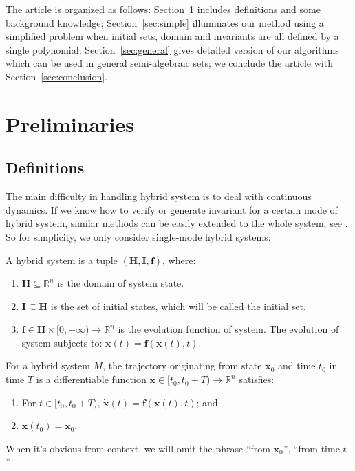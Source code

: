 \documentclass{jssc}
\begin{document}
The article is organized as follows: Section~\ref{sec:preliminaries} includes definitions and some background knowledge; Section~\ref{sec:simple} illuminates our method using a simplified problem when initial sets, domain and invariants are all defined by a single polynomial; Section~\ref{sec:general} gives detailed version of our algorithms which can be used in general semi-algebraic sets; we conclude the article with Section~\ref{sec:conclusion}.

\section{Preliminaries}
\label{sec:preliminaries}
\subsection{Definitions}
The main difficulty in handling hybrid system is to deal with continuous dynamics. If we know how to verify or generate invariant for a certain mode of hybrid system, similar methods can be easily extended to the whole system, see \cite{prajna2004safety, kong2016invariant}. So for simplicity, we only consider single-mode hybrid systems:

\begin{definition}
A hybrid system is a tuple $(\boldsymbol{H}, \boldsymbol{I}, \boldsymbol{f})$,  where:
	\begin{enumerate}
		\item $\boldsymbol{H} \subseteq \mathbb{R}^n$  is the domain of system state.
		\item $\boldsymbol{I} \subseteq \boldsymbol{H}$ is the set of initial states, which will be called the initial set.
		\item $\boldsymbol{f} \in \boldsymbol{H} \times [0, +\infty) \rightarrow \mathbb{R}^n$ is the evolution function of system. The evolution of system subjects to: $\dot{\boldsymbol{x}}(t) = \boldsymbol{f}(\boldsymbol{x}(t),t)$.
	\end{enumerate}
\end{definition}

\begin{definition}[Trajectory]
For a hybrid system $M$, the trajectory originating from state $\boldsymbol{x}_0$ and time $t_0$ in time $T$ is a differentiable function $\boldsymbol{x} \in [t_0, t_0 + T) \rightarrow \mathbb{R}^n$ satisfies:
	\begin{enumerate}
		\item For $t \in [t_0, t_0 + T)$, $\dot{\boldsymbol{x}}(t) = \boldsymbol{f}(\boldsymbol{x}(t),t)$; and
		\item $\boldsymbol{x}(t_0) = \boldsymbol{x}_0$.
	\end{enumerate}
	
When it's obvious from context, we will omit the phrase ``from $\boldsymbol{x}_0$'', ``from time $t_0$''.
\end{definition}
\end{document}
